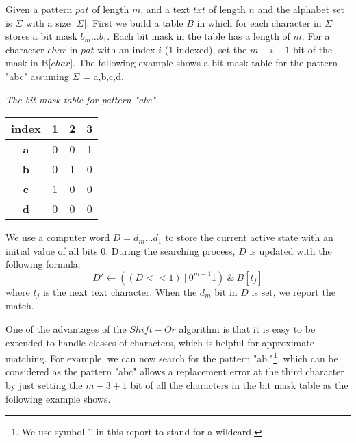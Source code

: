 Given a pattern $pat$ of length $m$,  and a text $txt$ of length $n$ and the alphabet set is $\Sigma$ with a size $|\Sigma|$. First we build a table $B$ in which for each character in $\Sigma$ stores a bit mask $b_m...b_1$. Each bit mask in the table has a length of $m$. For a character $char$ in $pat$ with an index $i$ (1-indexed), set the $m-i-1$ bit of the mask in B[$char$]. The following example shows a bit mask table for the pattern "abc" assuming $\Sigma$ = {a,b,c,d}.


\begin{example}\emph{The bit mask table for pattern "abc".}

\begin{table}[H]
	\centering
	\begin{tabular}{|c|c|c|c|}
		\hline
		index      & 1                        & 2                        & 3                        \\ \hline
		\textbf{a} & 0                        & 0                        & {\color[HTML]{3531FF} 1} \\ \hline
		\textbf{b} & 0                        & {\color[HTML]{3531FF} 1} & 0                        \\ \hline
		\textbf{c} & {\color[HTML]{3531FF} 1} & 0                        & 0                        \\ \hline
		\textbf{d} & 0                        & 0                        & 0                        \\ \hline
	\end{tabular}
	\label{table-bitmask}
\end{table}
\end{example}

We use a computer word $D = d_m...d_1$ to store the current active state with an initial value of all bits 0. During the searching process, $D$ is updated with the following formula: 
$$D' \leftarrow ((D << 1) \ | \ 0^{m-1}1) \ \& \ B[t_j]$$
where $t_j$ is the next text character.  When the $d_m$ bit in $D$ is set, we report the match. 

One of the advantages of the $Shift-Or$ algorithm is that it is easy to be extended to handle classes of characters, which is helpful for approximate matching. 
For example, we can now search for the pattern "ab."\footnote{ We use symbol '.' in this report to stand for a wildcard.}, which can be considered as the pattern "abc" allows a replacement error at the third character by just setting the $m-3+1$ bit of all the characters in the bit mask table as the following example shows. 


